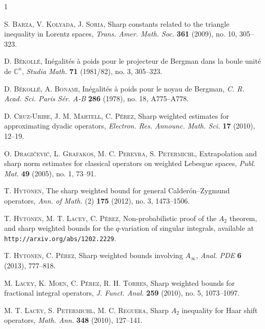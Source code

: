 \documentclass[a4paper,11pt,intlimits,oneside]{amsart}
\theoremstyle{definition}
\numberwithin{equation}{section}
\theoremstyle{definition}
\begin{document}

\begin{thebibliography}{1}

\textsc{S. Barza, V. Kolyada, J. Soria}, Sharp constants related to the triangle inequality in Lorentz spaces, \emph{Trans. Amer. Math. Soc.} \textbf{361} (2009), no. 10, 305--323.

\textsc{D. B\'ekoll\'e}, In\'egalit\'es \`a poids pour le projecteur de Bergman dans la boule unit\'e de $\mathbb {C}^n$, \emph{Studia Math.} \textbf{71} (1981/82), no. 3, 305--323.

\textsc{D. B\'ekoll\'e, A. Bonami}, In\'egalit\'es \`a poids pour le noyau de Bergman, \emph{C. R. Acad. Sci. Paris S\'er. A-B} \textbf{286} (1978), no. 18, A775--A778.

\textsc{D. Cruz-Uribe, J. M. Martell, C. P\'erez}, Sharp weighted estimates for approximating dyadic operators, \emph{Electron. Res. Announc. Math. Sci.} \textbf{17} (2010), 12--19.

\textsc{O. Dragi\v{c}evi\'c, L. Grafakos, M. C. Pereyra, S. Petermichl}, Extrapolation and sharp norm estimates for classical operators on weighted Lebesgue spaces, \emph{Publ. Mat.} \textbf{49} (2005), no. 1, 73--91.


\textsc{T. Hyt\"onen}, The sharp weighted bound for general Calder\'on--Zygmund operators, \emph{Ann. of Math.} (2) \textbf{175} (2012), no. 3, 1473--1506.

\textsc{T. Hyt\"onen, M. T. Lacey, C. P\'erez}, Non-probabilistic proof of the $A_2$ theorem, and sharp weighted bounds for the $q$-variation of singular integrals, available at \texttt{http://arxiv.org/abs/1202.2229}.

\textsc{T. Hyt\"onen, C. P\'erez}, Sharp weighted bounds involving $A_\infty$, \emph{Anal. PDE} \textbf{6} (2013), 777--818.

\textsc{M. Lacey, K. Moen, C. P\'erez, R. H. Torres}, Sharp weighted bounds for fractional integral operators, \emph{J. Funct. Anal.} \textbf{259} (2010), no. 5, 1073--1097.

\textsc{M. T. Lacey, S. Petermichl, M. C. Reguera}, Sharp $A_2$ inequality for Haar shift operators, \emph{Math. Ann.} \textbf{348} (2010), 127--141.


\end{thebibliography}
\end{document}
